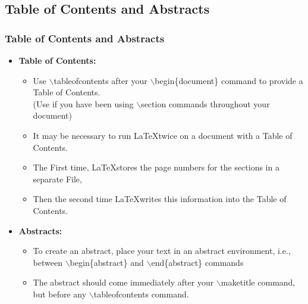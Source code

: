 \documentclass [9pt] {beamer}
\begin{document}
\subsection{Table of Contents and Abstracts}\label{Table of Contents and Abstracts}
\begin{frame}\frametitle{Table of Contents and Abstracts}
\rm
\fontsize{9pt}{11pt}\selectfont
\begin{itemize}
\item \textbf{Table of Contents:}
\begin{itemize}
  \item Use \textcolor[rgb]{0.98,0.00,0.00}{$\backslash$tableofcontents} after your \textcolor[rgb]{0.98,0.00,0.00}{$\backslash$begin\{document\}} command to provide a Table of Contents.\\ (Use if you have been using \textcolor[rgb]{0.98,0.00,0.00}{$\backslash$section} commands throughout your document)\\[.20cm]
  \item It may be necessary to run \LaTeX twice on a document with a Table of Contents.\\[.20cm]
  \item The First time, \LaTeX stores the page numbers for the sections in a separate File, \\[.20cm]
  \item Then the second time \LaTeX writes this information into the Table of Contents.\\[.20cm]
\end{itemize}

  \item \textbf{Abstracts:}
\begin{itemize}
  \item To create an abstract, place your text in an abstract environment, i.e., between \textcolor[rgb]{0.98,0.00,0.00}{$\backslash$begin\{abstract\}} and \textcolor[rgb]{0.98,0.00,0.00}{$\backslash$end\{abstract\}} commands\\[.20cm]
  \item The abstract should come immediately after your \textcolor[rgb]{0.98,0.00,0.00}{$\backslash$maketitle} command, but before any \textcolor[rgb]{0.98,0.00,0.00}{$\backslash$tableofcontents} command.\\[.20cm]
\end{itemize}
  \end{itemize}
\end{frame}
\end{document}
